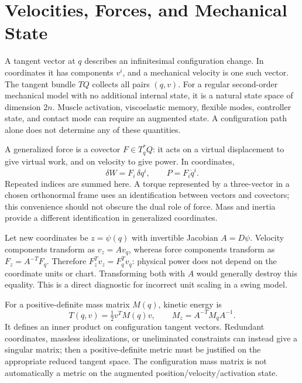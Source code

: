 \documentclass[12pt, openany]{book}
\theoremstyle{plain}
\begin{document}
\section{Velocities, Forces, and Mechanical State}

A tangent vector at $q$ describes an infinitesimal configuration change. In
coordinates it has components $v^i$, and a mechanical velocity is one such
vector. The tangent bundle $TQ$ collects all pairs $(q,v)$. For a regular
second-order mechanical model with no additional internal state, it is a
natural state space of dimension $2n$. Muscle activation, viscoelastic memory,
flexible modes, controller state, and contact mode can require an augmented
state. A configuration path alone does not determine any of these quantities.

A generalized force is a covector $F\in T_q^*Q$: it acts on a virtual
displacement to give virtual work, and on velocity to give power. In coordinates,
\begin{equation}\label{eq:manifold_force_power}
 \delta W=F_i\,\delta q^i,\qquad P=F_i\dot q^i.
\end{equation}
Repeated indices are summed here. A torque represented by a three-vector in
a chosen orthonormal frame uses an identification between vectors and
covectors; this convenience should not obscure the dual role of force.
Mass and inertia provide a different identification in generalized coordinates.

Let new coordinates be $z=\psi(q)$ with invertible Jacobian $A=D\psi$.
Velocity components transform as $v_z=A v_q$, whereas force components
transform as $F_z=A^{-T}F_q$. Therefore $F_z^Tv_z=F_q^Tv_q$: physical power
does not depend on the coordinate units or chart. Transforming both with $A$
would generally destroy this equality. This is a direct diagnostic for
incorrect unit scaling in a swing model.

For a positive-definite mass matrix $M(q)$, kinetic energy is
\begin{equation}\label{eq:manifold_kinetic_metric}
 T(q,v)=\tfrac12v^TM(q)v,\qquad
 M_z=A^{-T}M_qA^{-1}.
\end{equation}
It defines an inner product on configuration tangent vectors. Redundant
coordinates, massless idealizations, or uneliminated constraints can instead
give a singular matrix; then a positive-definite metric must be justified on
the appropriate reduced tangent space. The configuration mass matrix is not
automatically a metric on the augmented position/velocity/activation state.
\end{document}
